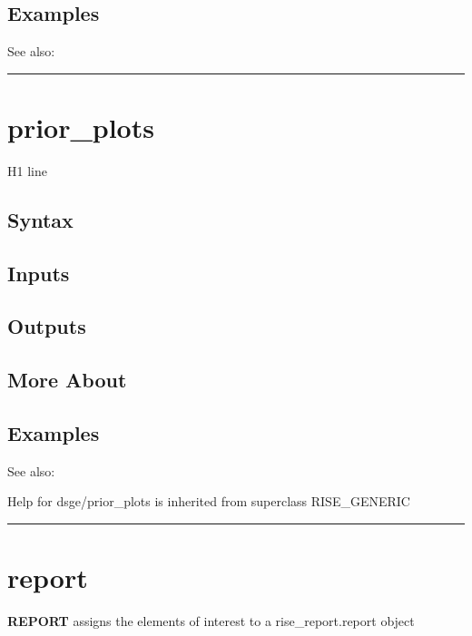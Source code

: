 \documentclass[letterpaper,10pt,english]{sphinxmanual}
\begin{document}
\subsection{Examples}
\label{classes/models/@dsge/dsge:id139}
See also:


\bigskip\hrule{}\bigskip



\section{prior\_plots}
\label{classes/models/@dsge/dsge:prior-plots}\label{classes/models/@dsge/dsge:id140}
H1 line


\subsection{Syntax}
\label{classes/models/@dsge/dsge:id141}

\subsection{Inputs}
\label{classes/models/@dsge/dsge:id142}

\subsection{Outputs}
\label{classes/models/@dsge/dsge:id143}

\subsection{More About}
\label{classes/models/@dsge/dsge:id144}

\subsection{Examples}
\label{classes/models/@dsge/dsge:id145}
See also:

Help for dsge/prior\_plots is inherited from superclass RISE\_GENERIC


\bigskip\hrule{}\bigskip



\section{report}
\label{classes/models/@dsge/dsge:report}\label{classes/models/@dsge/dsge:id146}
\textbf{REPORT} assigns the elements of interest to a rise\_report.report object
\end{document}
